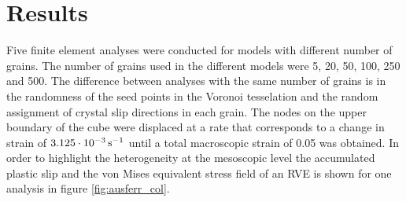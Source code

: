 \documentclass[crystal_plast.tex]{subfiles}
\begin{document}
%
%



\section{Results}

Five finite element analyses were conducted for models with different number of grains. The number of grains used in the different models were 5, 20, 50, 100, 250 and 500. The difference between analyses with the same number of grains is in the randomness of the seed points in the Voronoi tesselation and the random assignment of crystal slip directions in each grain.  The nodes on the upper boundary of the cube were displaced at a rate that corresponds to a change in strain of $\unit[3.125 \cdot 10^{-3}]{s^{-1}}$ until a total macroscopic strain of 0.05 was obtained. In order to highlight the heterogeneity at the mesoscopic level the accumulated plastic slip and the von Mises equivalent stress field of an RVE is shown for one analysis in figure \ref{fig:ausferr_col}. 
\end{document}
